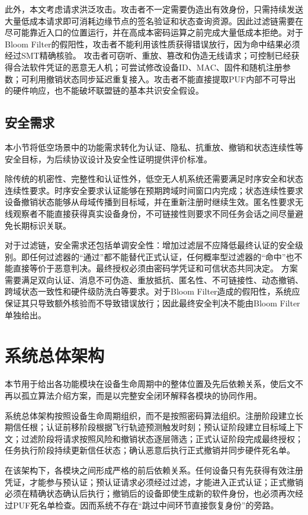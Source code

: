 \documentclass[conference]{IEEEtran}
\begin{document}
	此外，本文考虑请求洪泛攻击。攻击者不一定需要伪造出有效身份，只需持续发送大量低成本请求即可消耗边缘节点的签名验证和状态查询资源。因此过滤链需要在尽可能靠近入口的位置运行，并在高成本密码运算之前完成大量低成本拒绝。对于Bloom Filter的假阳性，攻击者不能利用该性质获得错误放行，因为命中结果必须经过SMT精确核验。
	攻击者可窃听、重放、篡改和伪造无线请求；可控制已经获得合法软件凭证的恶意无人机；可尝试修改设备ID、MAC、固件和随机注册参数；可利用撤销状态同步延迟重复接入。攻击者不能直接提取PUF内部不可导出的硬件响应，也不能破坏联盟链的基本共识安全假设。
	
	\subsection{安全需求}
	
	本小节将低空场景中的功能需求转化为认证、隐私、抗重放、撤销和状态连续性等安全目标，为后续协议设计及安全性证明提供评价标准。
	
	除传统的机密性、完整性和认证性外，低空无人机系统还需要满足时序安全和状态连续性要求。时序安全要求认证能够在预期跨域时间窗口内完成；状态连续性要求设备撤销状态能够从母域传播到目标域，并在重新注册时继续生效。匿名性要求无线观察者不能直接获得真实设备身份，不可链接性则要求不同任务会话之间尽量避免长期标识关联。
	
	对于过滤链，安全需求还包括单调安全性：增加过滤层不应降低最终认证的安全级别。即任何过滤器的“通过”都不能替代正式认证，任何概率型过滤器的“命中”也不能直接等价于恶意判决。最终授权必须由密码学凭证和可信状态共同决定。
	方案需要满足双向认证、消息不可伪造、重放抵抗、匿名性、不可链接性、动态撤销、跨域状态一致性和硬件级防洗白等要求。对于Bloom Filter造成的假阳性，系统应保证其只导致额外核验而不导致错误放行；因此最终安全判决不能由Bloom Filter单独给出。
	
	\section{系统总体架构}
	
	本节用于给出各功能模块在设备生命周期中的整体位置及先后依赖关系，使后文不再以孤立算法介绍方案，而是以完整安全闭环解释各模块的协同作用。
	
	系统总体架构按照设备生命周期组织，而不是按照密码算法组织。注册阶段建立长期信任根；认证前移阶段根据飞行轨迹预测触发时刻；预认证阶段建立目标域上下文；过滤阶段将请求按照风险和撤销状态逐层筛选；正式认证阶段完成最终授权；任务执行阶段持续更新信任状态；确认恶意后执行正式撤销并同步硬件死名单。
	
	在该架构下，各模块之间形成严格的前后依赖关系。任何设备只有先获得有效注册凭证，才能参与预认证；预认证请求必须经过过滤，才能进入正式认证；正式撤销必须在精确状态确认后执行；撤销后的设备即使生成新的软件身份，也必须再次经过PUF死名单检查。因而系统不存在“跳过中间环节直接恢复身份”的旁路。
	
\end{document}
